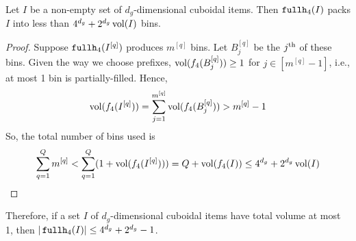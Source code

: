 \begin{lemma}
\label{lem:fh4}
Let $I$ be a non-empty set of $d_g$-dimensional cuboidal items.
Then $\fhk[4](I)$ packs $I$ into less than $4^{d_g} + 2^{d_g}\vol(I)$ bins.
\end{lemma}
\begin{proof}
Suppose $\fhk[4](I^{[q]})$ produces $m^{[q]}$ bins. Let $B_j^{[q]}$ be the $j\Th$ of these bins.
Given the way we choose prefixes, $\vol(f_4(B_j^{[q]})) \ge 1$ for $j \in [m^{[q]}-1]$,
i.e., at most 1 bin is partially-filled. Hence,
\[ \vol(f_4(I^{[q]})) = \sum_{j=1}^{m^{[q]}} \vol(f_4(B_j^{[q]})) > m^{[q]}-1 \]
So, the total number of bins used is
\[ \sum_{q=1}^Q m^{[q]} < \sum_{q=1}^Q (1 + \vol(f_4(I^{[q]})))
= Q + \vol(f_4(I)) \le 4^{d_g} + 2^{d_g}\vol(I) \qedhere \]
\end{proof}

Therefore, if a set $I$ of $d_g$-dimensional cuboidal items have total volume at most 1,
then $|\fhk[4](I)| \le 4^{d_g} + 2^{d_g} - 1$.
